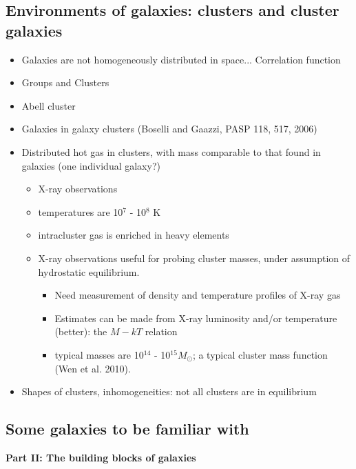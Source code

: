 \documentclass{article}
\begin{document}
\subsection{Environments of galaxies: clusters and cluster galaxies}
    \begin{itemize}
      \item Galaxies are not homogeneously distributed in space...
      Correlation function
      \item Groups and Clusters
      \item Abell cluster
      \item Galaxies in galaxy clusters (Boselli and Gaazzi, PASP 118,
      517, 2006)
      \item Distributed hot gas in clusters, with mass comparable to
      that found in galaxies (one individual galaxy?)
      \begin{itemize}
        \item X-ray observations
        \item temperatures are 10$^7$ - 10$^8$ K
        \item intracluster gas is enriched in heavy elements
        \item X-ray observations useful for probing cluster masses,
        under assumption of hydrostatic equilibrium.
        \begin{itemize}
          \item Need measurement of density and temperature profiles
          of X-ray gas
          \item Estimates can be made from X-ray luminosity and/or
          temperature (better): the $M - kT$ relation
          \item typical masses are 10$^{14}$ - 10$^{15} M_{\odot}$; a
          typical cluster mass function (Wen et al. 2010).
        \end{itemize}
      \end{itemize}
      \item Shapes of clusters, inhomogeneities: not all clusters are
      in equilibrium
    \end{itemize}

\subsection{Some galaxies to be familiar with}

\newpage
\begin{center}
    \fontsize{20}{22}\selectfont\textbf{Part II: The building blocks of galaxies}
\end{center}
\end{document}
